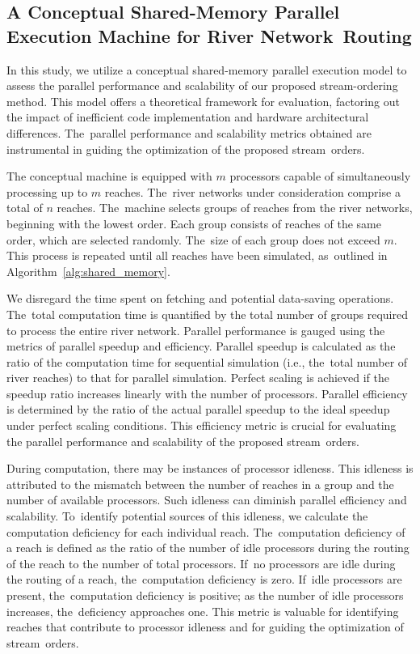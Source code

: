 \documentclass[water,article,accept,pdftex,moreauthors]{Definitions/mdpi}
\begin{document}
\subsection{A Conceptual Shared-Memory Parallel Execution Machine for River Network~Routing}
\label{sec:parallel_machine}

In this study, we utilize a conceptual shared-memory parallel execution model to assess the parallel performance and scalability of our proposed stream-ordering method. This model offers a theoretical framework for evaluation, factoring out the impact of inefficient code implementation and hardware architectural differences. The~parallel performance and scalability metrics obtained are instrumental in guiding the optimization of the proposed stream~orders.

The conceptual machine is equipped with $m$ processors capable of simultaneously processing up to $m$ reaches. The~river networks under consideration comprise a total of $n$ reaches. The~machine selects groups of reaches from the river networks, beginning with the lowest order. Each group consists of reaches of the same order, which are selected randomly. The~size of each group does not exceed $m$. This process is repeated until all reaches have been simulated, as~outlined in Algorithm~\ref{alg:shared_memory}.

We disregard the time spent on fetching and potential data-saving operations. The~total computation time is quantified by the total number of groups required to process the entire river network. Parallel performance is gauged using the metrics of parallel speedup and efficiency. Parallel speedup is calculated as the ratio of the computation time for sequential simulation (i.e., the~total number of river reaches) to that for parallel simulation. Perfect scaling is achieved if the speedup ratio increases linearly with the number of processors. Parallel efficiency is determined by the ratio of the actual parallel speedup to the ideal speedup under perfect scaling conditions. This efficiency metric is crucial for evaluating the parallel performance and scalability of the proposed stream~orders.

During computation, there may be instances of processor idleness. This idleness is attributed to the mismatch between the number of reaches in a group and the number of available processors. Such idleness can diminish parallel efficiency and scalability. To~identify potential sources of this idleness, we calculate the computation deficiency for each individual reach. The~computation deficiency of a reach is defined as the ratio of the number of idle processors during the routing of the reach to the number of total processors. If~no processors are idle during the routing of a reach, the~computation deficiency is zero. If~idle processors are present, the~computation deficiency is positive; as the number of idle processors increases, the~deficiency approaches one. This metric is valuable for identifying reaches that contribute to processor idleness and for guiding the optimization of stream~orders.
\end{document}
